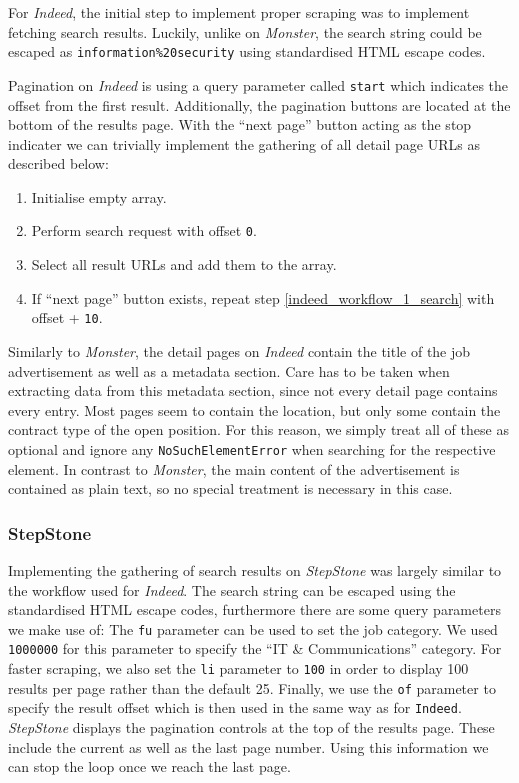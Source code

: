 \documentclass[runningheads]{llncs}
\begin{document}
For \textit{Indeed}, the initial step to implement proper scraping was to implement fetching search results. Luckily, unlike on \textit{Monster}, the search string could be escaped as \texttt{information\%20security} using standardised HTML escape codes.

Pagination on \textit{Indeed} is using a query parameter called \texttt{start} which indicates the offset from the first result. Additionally, the pagination buttons are located at the bottom of the results page. With the “next page” button acting as the stop indicater we can trivially implement the gathering of all detail page URLs as described below:

\begin{enumerate}
  \item Initialise empty array.
  \item \label{indeed_workflow_1_search}
    Perform search request with offset \texttt{0}.
  \item Select all result URLs and add them to the array.
  \item If “next page” button exists, repeat step \ref{indeed_workflow_1_search} with offset + \texttt{10}.
\end{enumerate}

Similarly to \textit{Monster}, the detail pages on \textit{Indeed} contain the title of the job advertisement as well as a metadata section. Care has to be taken when extracting data from this metadata section, since not every detail page contains every entry. Most pages seem to contain the location, but only some contain the contract type of the open position. For this reason, we simply treat all of these as optional and ignore any \texttt{NoSuchElementError} when searching for the respective element. In contrast to \textit{Monster}, the main content of the advertisement is contained as plain text, so no special treatment is necessary in this case.

\subsubsection{StepStone}
\label{subsub:stepstone}

Implementing the gathering of search results on \textit{StepStone} was largely similar to the workflow used for \textit{Indeed}. The search string can be escaped using the standardised HTML escape codes, furthermore there are some query parameters we make use of: The \texttt{fu} parameter can be used to set the job category. We used \texttt{1000000} for this parameter to specify the “IT \& Communications” category. For faster scraping, we also set the \texttt{li} parameter to \texttt{100} in order to display 100 results per page rather than the default 25. Finally, we use the \texttt{of} parameter to specify the result offset which is then used in the same way as for \texttt{Indeed}. \textit{StepStone} displays the pagination controls at the top of the results page. These include the current as well as the last page number. Using this information we can stop the loop once we reach the last page.
\end{document}
